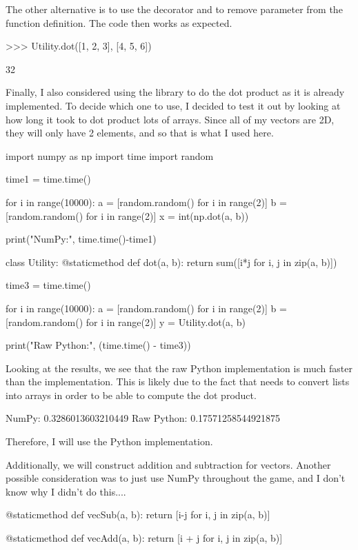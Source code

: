\vs
The other alternative is to use the  decorator and to remove  parameter from the function definition. The code then works as expected.

\begin{mpy}
>>> Utility.dot([1, 2, 3], [4, 5, 6])

32
\end{mpy}
Finally, I also considered using the library  to do the dot product as it is already implemented. To decide which one to use, I decided to test it out by looking at how long it took to dot product lots of arrays. Since all of my vectors are 2D, they will only have 2 elements, and so that is what I used here.

\vs
\begin{mpy}
import numpy as np
import time
import random

time1 = time.time()

for i in range(10000):
    a = [random.random() for i in range(2)]
    b = [random.random() for i in range(2)]
    x = int(np.dot(a, b))
    
print("NumPy:", time.time()-time1)


class Utility:
    @staticmethod
    def dot(a, b):
        return sum([i*j for i, j in zip(a, b)])
        
time3 = time.time()

for i in range(10000):
    a = [random.random() for i in range(2)]
    b = [random.random() for i in range(2)]
    y = Utility.dot(a, b)
    
print("Raw Python:", (time.time() - time3))
\end{mpy}
\vs
Looking at the results, we see that the raw Python implementation is much faster than the  implementation. This is likely due to the fact that  needs to convert lists into  arrays in order to be able to compute the dot product.

\begin{mpy}
NumPy: 0.3286013603210449
Raw Python: 0.17571258544921875
\end{mpy}
\vs
Therefore, I will use the Python implementation.

\vs
Additionally, we will construct addition and subtraction for vectors. Another possible consideration was to just use NumPy throughout the game, and I don't know why I didn't do this.... 

\begin{mpy}
    @staticmethod
    def vecSub(a, b):
        return [i-j for i, j in zip(a, b)]

    @staticmethod
    def vecAdd(a, b):
        return [i + j for i, j in zip(a, b)]
\end{mpy}
\vs

